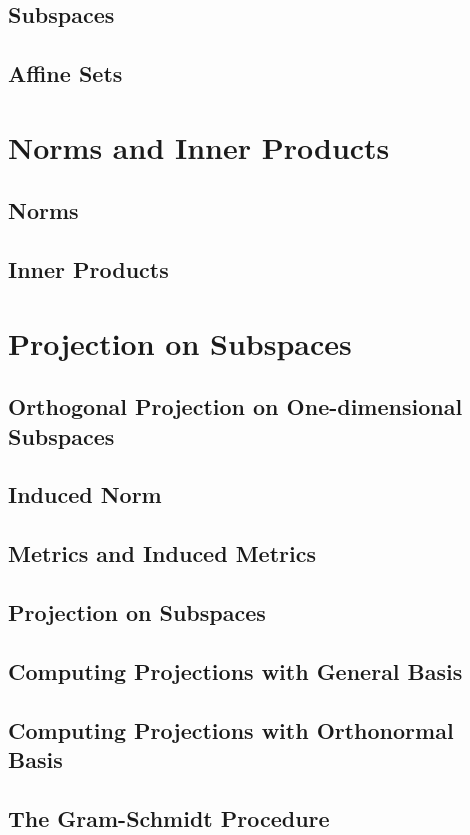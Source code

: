 \documentclass[10pt]{article}
\begin{document}
\subsection{Subspaces}
\subsection{Affine Sets}

\section{Norms and Inner Products}
\subsection{Norms}
\subsection{Inner Products} 

\section{Projection on Subspaces}
\subsection{Orthogonal Projection on One-dimensional Subspaces}
\subsection{Induced Norm}
\subsection{Metrics and Induced Metrics}
\subsection{Projection on Subspaces}
\subsection{Computing Projections with General Basis}
\subsection{Computing Projections with Orthonormal Basis}
\subsection{The Gram-Schmidt Procedure}
\end{document}
